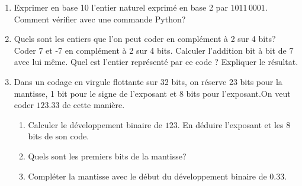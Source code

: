 \begin{enumerate}
  \item Exprimer en base 10 l'entier naturel exprimé en base 2 par $1011\, 0001$. Comment vérifier avec une commande Python?
  \item Quels sont les entiers que l'on peut coder en complément à 2 sur 4 bits? Coder 7 et -7 en complément à 2 sur 4 bits. Calculer l'addition bit à bit de $7$ avec lui même. Quel est l'entier représenté par ce code ? Expliquer le résultat.
  \item Dans un codage en virgule flottante sur 32 bits, on réserve 23 bits pour la mantisse, 1 bit pour le signe de l'exposant et 8 bits pour l'exposant.\newline On veut coder $123.33$ de cette manière.
  \begin{enumerate}
    \item Calculer le développement binaire de $123$. En déduire l'exposant et les 8 bits de son code.
    \item Quels sont les premiers bits de la mantisse? 
    \item Compléter la mantisse avec le début du développement binaire de $0.33$.
  \end{enumerate}

\end{enumerate}
